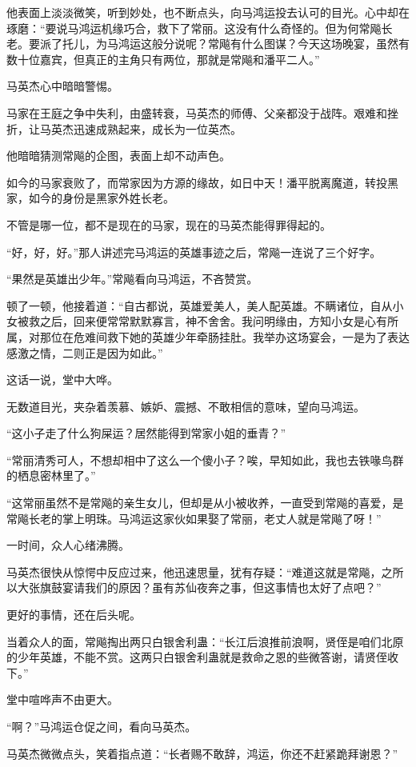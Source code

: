 \begin{this_body}
他表面上淡淡微笑，听到妙处，也不断点头，向马鸿运投去认可的目光。心中却在琢磨：“要说马鸿运机缘巧合，救下了常丽。这没有什么奇怪的。但为何常飚长老。要派了托儿，为马鸿运这般分说呢？常飚有什么图谋？今天这场晚宴，虽然有数十位嘉宾，但真正的主角只有两位，那就是常飚和潘平二人。”

马英杰心中暗暗警惕。

马家在王庭之争中失利，由盛转衰，马英杰的师傅、父亲都没于战阵。艰难和挫折，让马英杰迅速成熟起来，成长为一位英杰。

他暗暗猜测常飚的企图，表面上却不动声色。

如今的马家衰败了，而常家因为方源的缘故，如日中天！潘平脱离魔道，转投黑家，如今的身份是黑家外姓长老。

不管是哪一位，都不是现在的马家，现在的马英杰能得罪得起的。

“好，好，好。”那人讲述完马鸿运的英雄事迹之后，常飚一连说了三个好字。

“果然是英雄出少年。”常飚看向马鸿运，不吝赞赏。

顿了一顿，他接着道：“自古都说，英雄爱美人，美人配英雄。不瞒诸位，自从小女被救之后，回来便常常默默寡言，神不舍舍。我问明缘由，方知小女是心有所属，对那位在危难间救下她的英雄少年牵肠挂肚。我举办这场宴会，一是为了表达感激之情，二则正是因为如此。”

这话一说，堂中大哗。

无数道目光，夹杂着羡慕、嫉妒、震撼、不敢相信的意味，望向马鸿运。

“这小子走了什么狗屎运？居然能得到常家小姐的垂青？”

“常丽清秀可人，不想却相中了这么一个傻小子？唉，早知如此，我也去铁喙鸟群的栖息密林里了。”

“这常丽虽然不是常飚的亲生女儿，但却是从小被收养，一直受到常飚的喜爱，是常飚长老的掌上明珠。马鸿运这家伙如果娶了常丽，老丈人就是常飚了呀！”

一时间，众人心绪沸腾。

马英杰很快从惊愕中反应过来，他迅速思量，犹有存疑：“难道这就是常飚，之所以大张旗鼓宴请我们的原因？虽有苏仙夜奔之事，但这事情也太好了点吧？”

更好的事情，还在后头呢。

当着众人的面，常飚掏出两只白银舍利蛊：“长江后浪推前浪啊，贤侄是咱们北原的少年英雄，不能不赏。这两只白银舍利蛊就是救命之恩的些微答谢，请贤侄收下。”

堂中喧哗声不由更大。

“啊？”马鸿运仓促之间，看向马英杰。

马英杰微微点头，笑着指点道：“长者赐不敢辞，鸿运，你还不赶紧跪拜谢恩？”


\end{this_body}
